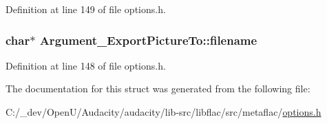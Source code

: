 Definition at line 149 of file options.\+h.

\subsubsection[{\texorpdfstring{filename}{filename}}]{\setlength{\rightskip}{0pt plus 5cm}char$\ast$ Argument\+\_\+\+Export\+Picture\+To\+::filename}\hypertarget{struct_argument___export_picture_to_ab895082d0b2b58146212c111f29f4bd8}{}\label{struct_argument___export_picture_to_ab895082d0b2b58146212c111f29f4bd8}


Definition at line 148 of file options.\+h.



The documentation for this struct was generated from the following file\+:\begin{DoxyCompactItemize}
\item 
C\+:/\+\_\+dev/\+Open\+U/\+Audacity/audacity/lib-\/src/libflac/src/metaflac/\hyperlink{libflac_2src_2metaflac_2options_8h}{options.\+h}\end{DoxyCompactItemize}
